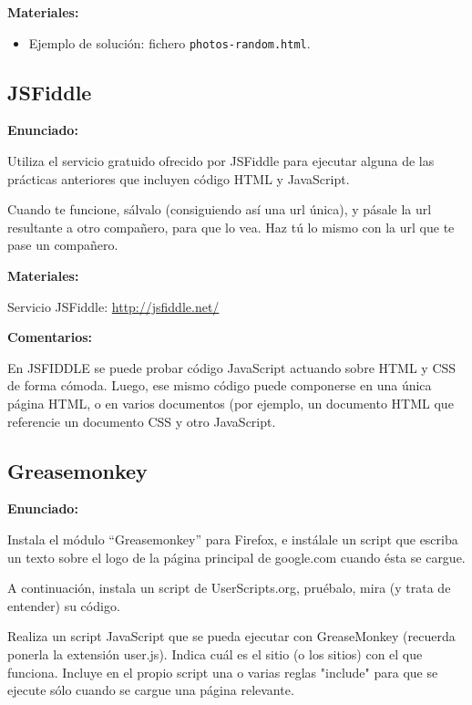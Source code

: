 \textbf{Materiales:}

\begin{itemize}
\item Ejemplo de solución: fichero \verb|photos-random.html|.
\end{itemize}


\subsection{JSFiddle}
\label{subsec:eje-js-jsfiddle}

\textbf{Enunciado:}

Utiliza el servicio gratuido ofrecido por JSFiddle para ejecutar alguna de las prácticas anteriores que incluyen código HTML y JavaScript.

Cuando te funcione, sálvalo (consiguiendo así una url única), y pásale la url resultante a otro compañero, para que lo vea. Haz tú lo mismo con la url que te pase un compañero.

\textbf{Materiales:}

Servicio JSFiddle: \url{http://jsfiddle.net/}

\textbf{Comentarios:}

En JSFIDDLE se puede probar código JavaScript actuando sobre HTML y CSS de forma cómoda. Luego, ese mismo código puede componerse en una única página HTML, o en varios documentos (por ejemplo, un documento HTML que referencie un documento CSS y otro JavaScript.


\subsection{Greasemonkey}
\label{subsec:eje-js-greasemonkey}

\textbf{Enunciado:}

Instala el módulo ``Greasemonkey'' para Firefox, e instálale un script que escriba un texto sobre el logo de la página principal de google.com cuando ésta se cargue.

A continuación, instala un script de UserScripts.org, pruébalo, mira (y trata de entender) su código.

Realiza un script JavaScript que se pueda ejecutar con GreaseMonkey (recuerda ponerla la extensión user.js). Indica cuál es el sitio (o los sitios) con el que funciona. Incluye en el propio script una o varias reglas "include" para que se ejecute sólo cuando se cargue una página relevante.

